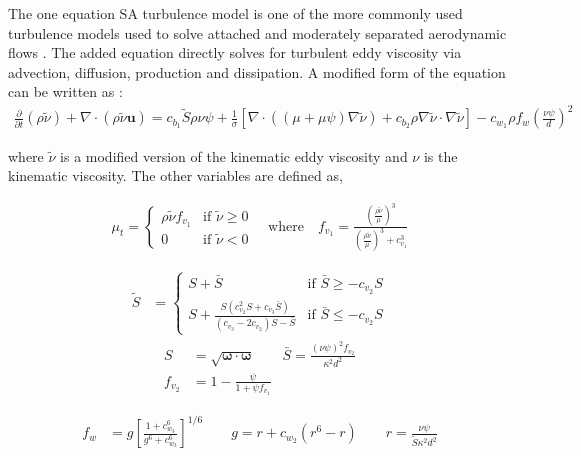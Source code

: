 The one equation SA turbulence model is one of the more commonly used turbulence models used to solve attached and moderately separated aerodynamic flows \cite{spalart1992one}. The added equation directly solves for turbulent eddy viscosity via advection, diffusion, production and dissipation. A modified form of the equation can be written as \cite{burgess2012robust,oliver2008high,moro2011navier}:
\begin{align}
	\frac{\partial}{\partial t}(\rho\tilde\nu) + \nabla\cdot(\rho\tilde\nu\boldsymbol{u}) = c_{b_1}\tilde S \rho\nu\psi + \frac{1}{\sigma}\left[\nabla\cdot((\mu + \mu\psi)\nabla\tilde\nu) + c_{b_2}\rho\nabla\tilde\nu\cdot\nabla\tilde\nu\right] - c_{w_1}\rho f_w \left(\frac{\nu\psi}{d}\right)^2
\end{align}

where $\tilde\nu$ is a modified version of the kinematic eddy viscosity and $\nu$ is the kinematic viscosity. The other variables are defined as,

\begin{align}
	 \mu_t =
	  \begin{cases}
	   \rho\tilde\nu f_{v_1} & \text{if } \tilde\nu \ge 0 \\
	   0       & \text{if } \tilde\nu < 0
	  \end{cases}
	  \quad \mbox{where} \quad f_{v_1} = \frac{\left(\frac{\rho\tilde\nu}{\mu}\right)^3}{\left(\frac{\rho\tilde\nu}{\mu}\right)^3 + c_{v_1}^3}
\end{align}

\begin{align}
	\tilde S &=
	\begin{cases}
	   S + \bar S & \text{if } \bar S \ge -c_{v_2}S \\
	   S + \frac{S(c_{v_2}^2 S + c_{v_3}\bar S)}{(c_{v_3} - 2c_{v_2})S - \bar S} & \text{if } \bar S \le -c_{v_2}S
	\end{cases}
\end{align}
\begin{align}
	S &= \sqrt{\boldsymbol{\omega}\cdot\boldsymbol{\omega}}
	\qquad \bar S = \frac{(\nu\psi)^2 f_{v_2}}{\kappa^2 d^2} \\
	f_{v_2} &= 1 - \frac{\psi}{1 + \psi f_{v_1}}
\end{align}

\begin{align}
	f_w &= g\left[\frac{1 + c_{w_3}^6}{g^6 + c_{w_3}^6}\right]^{1/6} 
	\qquad g = r + c_{w_2}(r^6 - r) 
	\qquad r = \frac{\nu\psi}{\tilde S \kappa^2 d^2}
\end{align}

